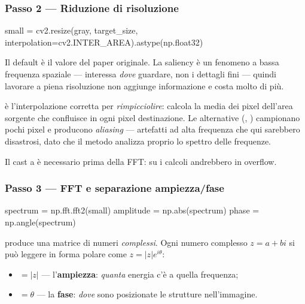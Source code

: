 \subsubsection{Passo 2 --- Riduzione di risoluzione}

\begin{idebox}
\begin{pycode}
small = cv2.resize(gray, target_size,
                   interpolation=cv2.INTER_AREA).astype(np.float32)
\end{pycode}
\end{idebox}

Il default  è il valore del paper originale. La saliency è un fenomeno
a bassa frequenza spaziale --- interessa \emph{dove} guardare, non i dettagli fini --- quindi
lavorare a piena risoluzione non aggiunge informazione e costa molto di più.

 è l'interpolazione corretta per \emph{rimpicciolire}: calcola la media dei
pixel dell'area sorgente che confluisce in ogni pixel destinazione. Le alternative
(, ) campionano pochi pixel e producono
\emph{aliasing} --- artefatti ad alta frequenza che qui sarebbero disastrosi, dato che il metodo
analizza proprio lo spettro delle frequenze.

Il cast a  è necessario prima della FFT: su  i calcoli andrebbero in
overflow.

\subsubsection{Passo 3 --- FFT e separazione ampiezza/fase}

\begin{idebox}
\begin{pycode}
spectrum = np.fft.fft2(small)
amplitude = np.abs(spectrum)
phase = np.angle(spectrum)
\end{pycode}
\end{idebox}

 produce una matrice di numeri \emph{complessi}. Ogni numero complesso
$z = a + bi$ si può leggere in forma polare come $z = |z| e^{i\theta}$:

\begin{itemize}
  \item {} $= |z|$ --- l'\textbf{ampiezza}: \emph{quanta} energia c'è a
  quella frequenza;
  \item {} $= \theta$ --- la \textbf{fase}: \emph{dove} sono posizionate
  le strutture nell'immagine.
\end{itemize}

